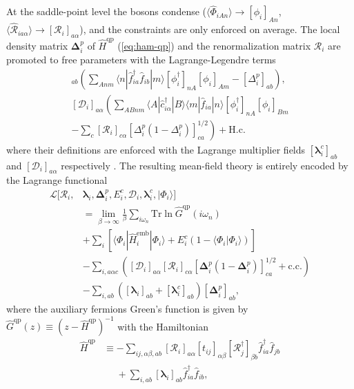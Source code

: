 \documentclass[reprint,aps,prb,amsmath,amssymb]{revtex4-2}
\begin{document}
At the saddle-point level the bosons condense ($\langle \hat{\Phi}_{iAn} \rangle \rightarrow [\phi_i]_{An}$, $\langle \hat{\mathcal{R}}_{ia\alpha} \rangle \rightarrow [\bm{\mathcal{R}}_i]_{a\alpha}$), and the constraints are only enforced on average. The local density matrix $\bm{\Delta}_i^p$ of $\hat{H}^{\mathrm{qp}}$ (\cref{eq:ham-qp}) and the renormalization matrix $\bm{\mathcal{R}}_i$ are promoted to free parameters with the Lagrange-Legendre terms
%
\begin{align}
[\bm{\lambda}_i^c]_{ab} \left( \sum_{Anm} \langle n| \hat{f}_{ia}^{\dagger} \hat{f}_{ib} |m \rangle [\phi_i^{\dagger}]_{nA} [\phi_i^{}]_{Am} - [\Delta_i^p]_{ab} \right), \\
%
[\bm{\mathcal{D}}_i]_{a\alpha} \left( \sum_{ABnm} \langle A |\hat{c}_{i\alpha}^{\dagger} | B \rangle \langle m | \hat{f}_{ia} |n\rangle [\phi_i^{\dagger}]_{nA} [\phi_i^{}]_{Bm} \right. \nonumber \\
%
\left. -\sum_c [\mathcal{R}_i]_{c\alpha} [ \Delta_i^p(1-\Delta_i^p)]_{ca}^{1/2} \right) + \mathrm{H.c.}
\end{align}
%
where their definitions are enforced with the Lagrange multiplier fields $[\bm{\lambda}_i^c]_{ab}$ and $[\bm{\mathcal{D}}_i]_{a\alpha}$ respectively \cite{Lanata2015,Lanata2017}. The resulting mean-field theory is entirely encoded by the Lagrange functional \cite{Lanata2017b}
\begin{align} \label{eq:risb-grand-potential}
\mathcal{L}[\bm{\mathcal{R}}_i, & \bm{\lambda}_i, \bm{\Delta}_i^p, E_i^c, \bm{\mathcal{D}}_i, \bm{\lambda}_i^c,|\Phi_i\rangle] \nonumber \\
%
&=  \lim_{\beta\rightarrow \infty} \frac{1}{\beta} \sum_{i\omega_n} \mathrm{Tr} \ln \hat{G}^{\mathrm{qp}}(i\omega_n) \nonumber \\
%
& + \sum_i \left[ \langle \Phi_i | \hat{H}_i^{\mathrm{emb}} | \Phi_i \rangle + E_i^c \left( 1 - \langle \Phi_i | \Phi_i \rangle \right) \right] \nonumber \\
%
& - \sum_{i,a\alpha c} \left( [\bm{\mathcal{D}}_i]_{a\alpha} [\bm{\mathcal{R}}_i]_{c\alpha} [\bm{\Delta}_i^p(1-\bm{\Delta}_i^p)]_{ca}^{1/2} + \textrm{c.c.} \right) \nonumber \\
%
& -\sum_{i, ab} \left( [\bm{\lambda}_i^{}]_{ab} + [\bm{\lambda}_i^c]_{ab} \right) [\bm{\Delta}_i^p]_{ab},
\end{align}
%
where the auxiliary fermions Green's function is given by $\hat{G}^{\mathrm{qp}}(z) \equiv (z - \hat{H}^{\mathrm{qp}})^{-1}$ with the Hamiltonian
%
\begin{align} \label{eq:ham-qp}
\hat{H}^{\mathrm{qp}} &\equiv -\sum_{ij,\alpha\beta,ab} [\bm{\mathcal{R}}_i^{}]_{a\alpha}^{} [t_{ij}]_{\alpha\beta}  [\bm{\mathcal{R}}_j^{\dagger}]_{\beta b}^{} \hat{f}_{ia}^{\dagger} \hat{f}_{jb}^{} \nonumber \\
%
& \phantom{{}\equiv} + \sum_{i,ab} [\bm{\lambda}_i^{}]_{ab}^{} \hat{f}_{ia}^{\dagger} \hat{f}_{ib}^{}, %
\end{align}
\end{document}
